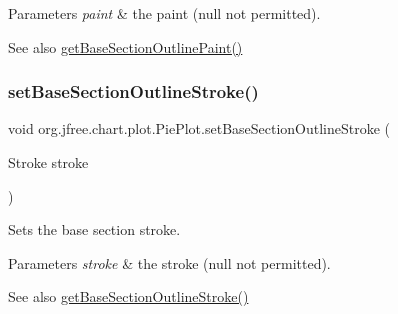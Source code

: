 \begin{DoxyParams}{Parameters}
{\em paint} & the paint ({\ttfamily null} not permitted).\\
\hline
\end{DoxyParams}
\begin{DoxySeeAlso}{See also}
\mbox{\hyperlink{classorg_1_1jfree_1_1chart_1_1plot_1_1_pie_plot_a09734d6fd44506facb9a597034af3eea}{get\+Base\+Section\+Outline\+Paint()}} 
\end{DoxySeeAlso}
\mbox{\label{classorg_1_1jfree_1_1chart_1_1plot_1_1_pie_plot_a79ef0ad7ef5443afe7f8834c07f10839}} 
\subsubsection{\texorpdfstring{set\+Base\+Section\+Outline\+Stroke()}{setBaseSectionOutlineStroke()}}
{\footnotesize\ttfamily void org.\+jfree.\+chart.\+plot.\+Pie\+Plot.\+set\+Base\+Section\+Outline\+Stroke (\begin{DoxyParamCaption}\item[{Stroke}]{stroke }\end{DoxyParamCaption})}

Sets the base section stroke.


\begin{DoxyParams}{Parameters}
{\em stroke} & the stroke ({\ttfamily null} not permitted).\\
\hline
\end{DoxyParams}
\begin{DoxySeeAlso}{See also}
\mbox{\hyperlink{classorg_1_1jfree_1_1chart_1_1plot_1_1_pie_plot_a30e131b03d74d18e60d06e69f4219df0}{get\+Base\+Section\+Outline\+Stroke()}} 
\end{DoxySeeAlso}
\mbox{\label{classorg_1_1jfree_1_1chart_1_1plot_1_1_pie_plot_a582a3691ba857599da8b77596e812a04}} 
